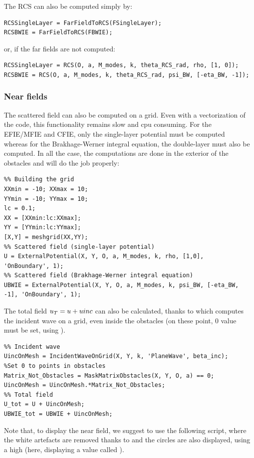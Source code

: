 The RCS can also be computed simply by:
\begin{lstlisting}
RCSSingleLayer = FarFieldToRCS(FSingleLayer);
RCSBWIE = FarFieldToRCS(FBWIE);
\end{lstlisting}
or, if the far fields are not computed:
\begin{lstlisting}
RCSSingleLayer = RCS(O, a, M_modes, k, theta_RCS_rad, rho, [1, 0]);
RCSBWIE = RCS(O, a, M_modes, k, theta_RCS_rad, psi_BW, [-eta_BW, -1]);
\end{lstlisting}

\subsubsection{Near fields}

The scattered field can also be computed on a grid. Even with a vectorization of the code, this functionality remains slow and cpu consuming. For the EFIE/MFIE and CFIE, only the single-layer potential must be computed whereas for the Brakhage-Werner integral equation, the double-layer must also be computed. In all the case, the computations are done in the exterior of the obstacles and \ExternalPotential will do the job properly:

\begin{lstlisting}
%% Building the grid
XXmin = -10; XXmax = 10;
YYmin = -10; YYmax = 10;
lc = 0.1;
XX = [XXmin:lc:XXmax];
YY = [YYmin:lc:YYmax];
[X,Y] = meshgrid(XX,YY);
%% Scattered field (single-layer potential)
U = ExternalPotential(X, Y, O, a, M_modes, k, rho, [1,0], 'OnBoundary', 1);
%% Scattered field (Brakhage-Werner integral equation)
UBWIE = ExternalPotential(X, Y, O, a, M_modes, k, psi_BW, [-eta_BW, -1], 'OnBoundary', 1);
\end{lstlisting}

The total field $u_T = u + uinc$ can also be calculated, thanks to \IncidentWaveOnGrid which computes the incident wave on a grid, even inside the obstacles (on these point, $0$ value must be set, using \MaskMatrixObstacles).

\begin{lstlisting}
%% Incident wave
UincOnMesh = IncidentWaveOnGrid(X, Y, k, 'PlaneWave', beta_inc);
%Set 0 to points in obstacles
Matrix_Not_Obstacles = MaskMatrixObstacles(X, Y, O, a) == 0;
UincOnMesh = UincOnMesh.*Matrix_Not_Obstacles;
%% Total field
U_tot = U + UincOnMesh;
UBWIE_tot = UBWIE + UincOnMesh;
\end{lstlisting}

Note that, to display the near field, we suggest to use the following script, where the white artefacts are removed thanks to  and the circles are also displayed, using a high  (here, displaying a value called ).

